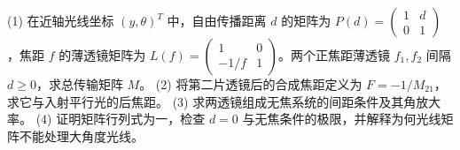 (1) 在近轴光线坐标 \((y,\theta)^T\) 中，自由传播距离 \(d\) 的矩阵为 \(P(d)=\begin{pmatrix}1&d\\0&1\end{pmatrix}\)，焦距 \(f\) 的薄透镜矩阵为 \(L(f)=\begin{pmatrix}1&0\\-1/f&1\end{pmatrix}\)。两个正焦距薄透镜 \(f_1,f_2\) 间隔 \(d\ge0\)，求总传输矩阵 \(M\)。
(2) 将第二片透镜后的合成焦距定义为 \(F=-1/M_{21}\)，求它与入射平行光的后焦距。
(3) 求两透镜组成无焦系统的间距条件及其角放大率。
(4) 证明矩阵行列式为一，检查 \(d=0\) 与无焦条件的极限，并解释为何光线矩阵不能处理大角度光线。
